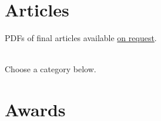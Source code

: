 \documentclass[%
  11pt,%
]{article}
\makeatletter
\newcommand{\onrequest}{\href{mailto:bhelm@fandm.edu}{on request}}
\makeatother
\begin{document}
\nocite{Helm2017Communities-Respect-Persons,Helm2010Love-Friendship-Self,Helm2001Emotional-Reason-Deliberation}

\printbibliography[heading=none]

\section{Articles}

\newrefsection
\nocite{*}


\begin{center}
  PDFs of final articles available \onrequest{}.\\
  ~
\end{center}

Choose a category below.

\printbibliography[filter=myarticle, heading=none]





\section{Awards}
\end{document}
